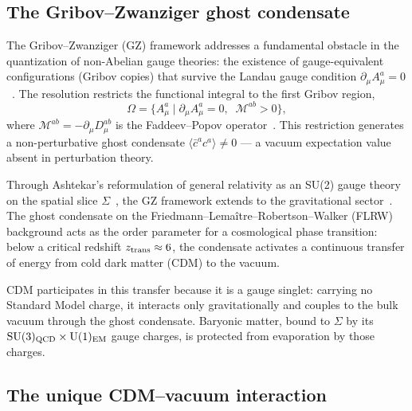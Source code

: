 \documentclass[a4paper,fleqn]{cas-dc}
\newcommand{\ztrans}{z_{\rm trans}}
\begin{document}
\subsection{The Gribov--Zwanziger ghost condensate}
\label{sec:gz}

The Gribov--Zwanziger (GZ) framework addresses a fundamental obstacle
in the quantization of non-Abelian gauge theories: the existence of
gauge-equivalent configurations (Gribov copies) that survive the
Landau gauge condition $\partial_\mu A^a_\mu = 0$~\cite{gribov1978}.
The resolution restricts the functional integral to the first Gribov
region,
\begin{equation}
\Omega = \bigl\{A^a_\mu \;\big|\;
  \partial_\mu A^a_\mu = 0,\;\;
  \mathcal{M}^{ab} > 0\bigr\},
\label{eq:gribov_region}
\end{equation}
where $\mathcal{M}^{ab} = -\partial_\mu D^{ab}_\mu$ is the
Faddeev--Popov operator~\cite{vandersickel2012}. This restriction generates a
non-perturbative ghost condensate
$\langle \bar{c}^a c^a \rangle \neq 0$ --- a vacuum expectation
value absent in perturbation theory.

Through Ashtekar's reformulation of general relativity as an SU(2)
gauge theory on the spatial slice
$\Sigma$~\cite{ashtekar1986}, the GZ framework extends to the
gravitational sector~\cite{capri2016}. The ghost condensate on the
Friedmann--Lema\^itre--Robertson--Walker (FLRW) background acts as
the order parameter for a cosmological phase transition: below a
critical redshift $\ztrans \approx 6$, the condensate activates a
continuous transfer of energy from cold dark matter (CDM) to the
vacuum.

CDM participates in this transfer because it is a gauge singlet:
carrying no Standard Model charge, it interacts only gravitationally
and couples to the bulk vacuum through the ghost condensate. Baryonic
matter, bound to $\Sigma$ by its
$\mathrm{SU}(3)_{\rm QCD} \times \mathrm{U}(1)_{\rm EM}$ gauge
charges, is protected from evaporation by those charges.

\subsection{The unique CDM--vacuum interaction}
\label{sec:interaction}
\end{document}
